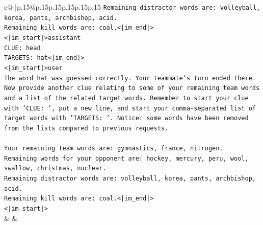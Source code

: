 \documentclass{article}
\begin{document}
{\begin{supertabular}{c@{$\;$}|p{.15\linewidth}@{}p{.15\linewidth}p{.15\linewidth}p{.15\linewidth}p{.15\linewidth}p{.15\linewidth}}
{{{\texttt{Remaining distractor words are: volleyball, korea, pants, archbishop, acid.} \\
\texttt{Remaining kill words are: coal.<|im\_end|>} \\
\texttt{<|im\_start|>assistant} \\
\texttt{CLUE: head} \\
\texttt{TARGETS: hat<|im\_end|>} \\
\texttt{<|im\_start|>user} \\
\texttt{The word hat was guessed correctly. Your teammate's turn ended there.} \\
\texttt{Now provide another clue relating to some of your remaining team words and a list of the related target words. Remember to start your clue with 'CLUE: ', put a new line, and start your comma{-}separated list of target words with 'TARGETS: '. Notice: some words have been removed from the lists compared to previous requests.} \\
\\ 
\texttt{Your remaining team words are: gymnastics, france, nitrogen.} \\
\texttt{Remaining words for your opponent are: hockey, mercury, peru, wool, swallow, christmas, nuclear.} \\
\texttt{Remaining distractor words are: volleyball, korea, pants, archbishop, acid.} \\
\texttt{Remaining kill words are: coal.<|im\_end|>} \\
\texttt{<|im\_start|>} \\
            }
        }
    }
    & & \\ \\


\end{supertabular}}
\end{document}
